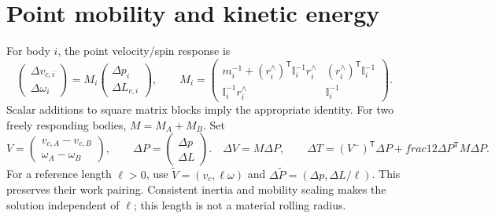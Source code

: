 \documentclass[11pt]{article}
\begin{document}
\section{Point mobility and kinetic energy}
For body $i$, the point velocity/spin response is
\begin{equation}
 \begin{pmatrix}\Delta v_{c,i}\\\Delta\omega_i\end{pmatrix}
 = M_i\begin{pmatrix}\Delta p_i\\\Delta L_{c,i}\end{pmatrix},\qquad
 M_i=\begin{pmatrix}
 m_i^{-1}+(r_i^{\wedge})^{\mathsf T}\mathbb I_i^{-1}r_i^{\wedge}
     &(r_i^{\wedge})^{\mathsf T}\mathbb I_i^{-1}\\
 \mathbb I_i^{-1}r_i^{\wedge}&\mathbb I_i^{-1}
 \end{pmatrix}.
\end{equation}
Scalar additions to square matrix blocks imply the appropriate identity.
For two freely responding bodies, $M=M_A+M_B$. Set
\begin{equation}
 V=\begin{pmatrix}v_{c,A}-v_{c,B}\\\omega_A-\omega_B\end{pmatrix},\qquad
 \Delta P=\begin{pmatrix}\Delta p\\\Delta L\end{pmatrix}.
 \quad \Delta V=M\Delta P,\qquad
 \Delta T=(V^-)^{\mathsf T}\Delta P+	frac12\Delta P^{\mathsf T}M\Delta P.
\end{equation}
For a reference length $\ell>0$, use
$\widetilde V=(v_c,\ell\omega)$ and
$\Delta\widetilde P=(\Delta p,\Delta L/\ell)$.
This preserves their work pairing. Consistent inertia and mobility scaling makes
the solution independent of $\ell$; this length is not a material rolling radius.
\end{document}
